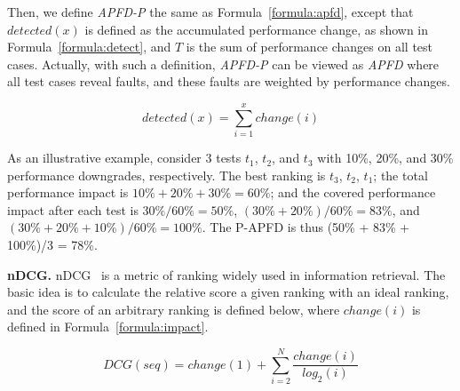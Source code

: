 Then, we define \textit{APFD-P} the same as  Formula~\ref{formula:apfd}, except that $detected(x)$ is defined as the accumulated performance change, as shown in Formula~\ref{formula:detect}, and $T$ is the sum of performance changes on all test cases. Actually, with such a definition, \textit{APFD-P} can be viewed as \textit{APFD} where all test cases reveal faults, and these faults are weighted by performance changes.

\begin{equation}
detected(x) = \sum_{i=1}^{x}change(i)
\label{formula:detect}
\end{equation}

As an illustrative example, consider 3 tests $t_1$, $t_2$, and $t_3$ with 10\%, 20\%, and 30\% performance downgrades, respectively. The best ranking is $t_3$, $t_2$, $t_1$; the total performance impact is $10\%+20\%+30\% = 60\%$; and the covered performance impact after each test is $30\%/60\% = 50\%$, $(30\%+20\%)/60\% = 83\%$, and $(30\%+20\%+10\%)/60\% = 100\%$. The P-APFD is thus (50\% + 83\% + 100\%)/3 = 78\%. 



\textbf{nDCG.} nDCG~\cite{NDCG} is a metric of ranking widely used in information retrieval. The basic idea is to calculate the relative score a given ranking with an ideal ranking, and the score of an arbitrary ranking is defined below, where $change(i)$ is defined in Formula~\ref{formula:impact}.


\begin{equation}
DCG (seq) = change(1) + \sum \limits_{i=2}^{N} \frac{ change(i)}{log_2(i)}
\label{formula:dcg}
\end{equation}




